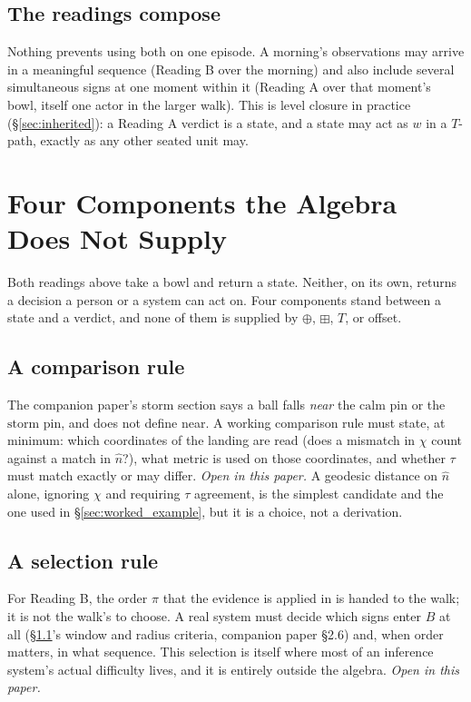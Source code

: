 \documentclass[12pt, a4paper]{article}
\begin{document}
\subsection{The readings compose}
\label{subsec:readings_compose}
Nothing prevents using both on one episode. A morning's observations
may arrive in a meaningful sequence (Reading B over the morning) and
also include several simultaneous signs at one moment within it
(Reading A over that moment's bowl, itself one actor in the larger
walk). This is level closure in practice (\S\ref{sec:inherited}): a
Reading A verdict is a state, and a state may act as $w$ in a $T$-path,
exactly as any other seated unit may.

\section{Four Components the Algebra Does Not Supply}
\label{sec:four_gaps}

Both readings above take a bowl and return a state. Neither, on its
own, returns a decision a person or a system can act on. Four
components stand between a state and a verdict, and none of them is
supplied by $\oplus$, $\boxplus$, $T$, or offset.

\subsection{A comparison rule}
\label{subsec:comparison_rule}
The companion paper's storm section says a ball falls \emph{near} the
$\mathrm{calm}$ pin or the $\mathrm{storm}$ pin, and does not define
near. A working comparison rule must state, at minimum: which
coordinates of the landing are read (does a mismatch in $\chi$ count
against a match in $\hat n$?), what metric is used on those
coordinates, and whether $\tau$ must match exactly or may differ.
\emph{Open in this paper.} A geodesic distance on $\hat n$ alone,
ignoring $\chi$ and requiring $\tau$ agreement, is the simplest
candidate and the one used in \S\ref{sec:worked_example}, but it is a
choice, not a derivation.

\subsection{A selection rule}
\label{subsec:selection_rule}
For Reading B, the order $\pi$ that the evidence is applied in is
handed to the walk; it is not the walk's to choose. A real system must
decide which signs enter $B$ at all (\S\ref{subsec:comparison_rule}'s
window and radius criteria, companion paper \S2.6) and, when order
matters, in what sequence. This selection is itself where most of an
inference system's actual difficulty lives, and it is entirely outside
the algebra. \emph{Open in this paper.}
\end{document}

